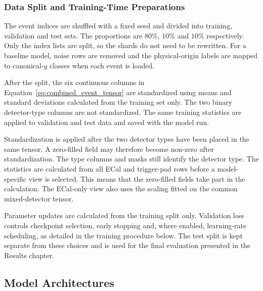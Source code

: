 \subsubsection{Data Split and Training-Time Preparations}

The event indices are shuffled with a fixed seed and divided into training,
validation and test sets. The proportions are \(80\%\), \(10\%\) and \(10\%\) respectively.
Only the index lists are split, so the shards do not need to be rewritten.
For a baseline model, noise rows are removed and the physical-origin labels
are mapped to canonical-\(y\) classes when each event is loaded.

After the split, the six continuous columns in
Equation~\eqref{eq:combined_event_tensor} are standardized using means and
standard deviations calculated from the training set only. The two binary
detector-type columns are not standardized. The same training statistics are
applied to validation and test data and saved with the model run.

Standardization is applied after the two detector types have been placed in
the same tensor. A zero-filled field may therefore become non-zero after
standardization. The type columns and masks still identify the detector type.
The statistics are calculated from all ECal and trigger-pad rows before a
model-specific view is selected. This means that the zero-filled fields take
part in the calculation. The ECal-only view also uses the scaling fitted on
the common mixed-detector tensor.

Parameter updates are calculated from the training split only. Validation
loss controls checkpoint selection, early stopping and, where enabled,
learning-rate scheduling, as detailed in the training procedure below. The
test split is kept separate from these choices and is used for the final
evaluation presented in the Results chapter.






























\subsection{Model Architectures}
\label{sec:method_models}


